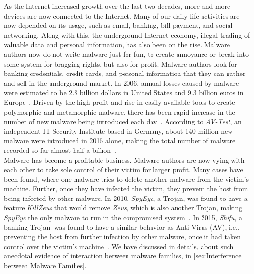 As the Internet increased growth over the last two decades, more and more devices are now connected to the Internet.
Many of our daily life activities are now depended on its usage, such as email, banking, bill payment, and social networking.
Along with this, the underground Internet economy, illegal trading of valuable data and personal information, has also been on the rise.
Malware authors now do not write malware just for fun, to create annoyance or break into some system for bragging rights, but also for profit.
Malware authors look for banking credentials, credit cards, and personal information that they can gather and sell in the underground market.
In 2006, annual losses caused by malware were estimated to be 2.8 billion dollars in United States and 9.3 billion euros in Europe~\cite[]{moore2009economics}.
Driven by the high profit and rise in easily available tools to create polymorphic and metamorphic malware, there has been rapid increase in the number of new malware being introduced each day~\cite[]{tian}.
According to \emph{AV-Test}, an independent IT-Security Institute based in Germany, about 140 million new malware were introduced in 2015 alone, making the total number of malware recorded so far almost half a billion~\cite[]{avtest}.\\

Malware has become a profitable business.
Malware authors are now vying with each other to take sole control of their victim for larger profit.
Many cases have been found, where one malware tries to delete another malware from the victim's machine.
Further, once they have infected the victim, they prevent the host from being infected by other malware.
In 2010, \emph{SpyEye}, a Trojan, was found to have a feature \emph{KillZeus} that would remove \emph{Zeus}, which is also another Trojan, making \emph{SpyEye} the only malware to run in the compromised system~\cite[]{sanszeus}.
In 2015, \emph{Shifu}, a banking Trojan, was found to have a similar behavior as Anti Virus (AV), i.e., preventing the host from further infection by other malware, once it had taken control over the victim's machine~\cite[]{secintelshifu}.
We have discussed in details, about such anecdotal evidence of interaction between malware families, in \autoref{sec:Interference between Malware Families}.
